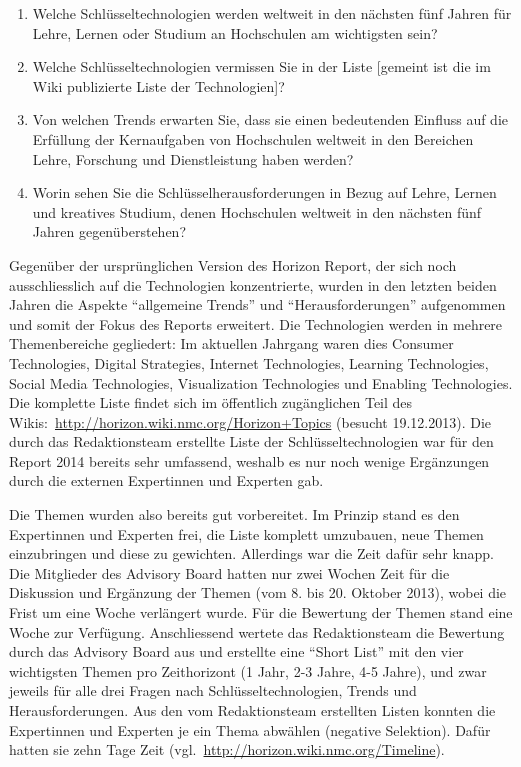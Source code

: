 \documentclass[a4paper,
fontsize=11pt,
oneside,
numbers=noperiodatend,
parskip=half-,
bibliography=totoc,
final
]{scrartcl}
\begin{document}
\begin{enumerate}
\def\labelenumi{\arabic{enumi}.}
\item
  Welche Schlüsseltechnologien werden weltweit in den nächsten fünf
  Jahren für Lehre, Lernen oder Studium an Hochschulen am wichtigsten
  sein?
\item
  Welche Schlüsseltechnologien vermissen Sie in der Liste {[}gemeint ist
  die im Wiki publizierte Liste der Technologien{]}?
\item
  Von welchen Trends erwarten Sie, dass sie einen bedeutenden Einfluss
  auf die Erfüllung der Kernaufgaben von Hochschulen weltweit in den
  Bereichen Lehre, Forschung und Dienstleistung haben werden?
\item
  Worin sehen Sie die Schlüsselherausforderungen in Bezug auf Lehre,
  Lernen und kreatives Studium, denen Hochschulen weltweit in den
  nächsten fünf Jahren gegenüberstehen?
\end{enumerate}

Gegenüber der ursprünglichen Version des Horizon Report, der sich noch
ausschliesslich auf die Technologien konzentrierte, wurden in den
letzten beiden Jahren die Aspekte \enquote{allgemeine Trends} und
\enquote{Herausforderungen} aufgenommen und somit der Fokus des Reports
erweitert. Die Technologien werden in mehrere Themenbereiche gegliedert:
Im aktuellen Jahrgang waren dies Consumer Technologies, Digital
Strategies, Internet Technologies, Learning Technologies, Social Media
Technologies, Visualization Technologies und Enabling Technologies. Die
komplette Liste findet sich im öffentlich zugänglichen Teil des
Wikis:~\url{http://horizon.wiki.nmc.org/Horizon+Topics} (besucht
19.12.2013). Die durch das Redaktionsteam erstellte Liste der
Schlüsseltechnologien war für den Report 2014 bereits sehr umfassend,
weshalb es nur noch wenige Ergänzungen durch die externen Expertinnen
und Experten gab.

Die Themen wurden also bereits gut vorbereitet. Im Prinzip stand es den
Expertinnen und Experten frei, die Liste komplett umzubauen, neue Themen
einzubringen und diese zu gewichten. Allerdings war die Zeit dafür sehr
knapp. Die Mitglieder des Advisory Board hatten nur zwei Wochen Zeit für
die Diskussion und Ergänzung der Themen (vom 8. bis 20. Oktober 2013),
wobei die Frist um eine Woche verlängert wurde. Für die Bewertung der
Themen stand eine Woche zur Verfügung. Anschliessend wertete das
Redaktionsteam die Bewertung durch das Advisory Board aus und erstellte
eine \enquote{Short List} mit den vier wichtigsten Themen pro
Zeithorizont (1 Jahr, 2-3 Jahre, 4-5 Jahre), und zwar jeweils für alle
drei Fragen nach Schlüsseltechnologien, Trends und Herausforderungen.
Aus den vom Redaktionsteam erstellten Listen konnten die Expertinnen und
Experten je ein Thema abwählen (negative Selektion). Dafür hatten sie
zehn Tage Zeit (vgl.~\url{http://horizon.wiki.nmc.org/Timeline}).
\end{document}
